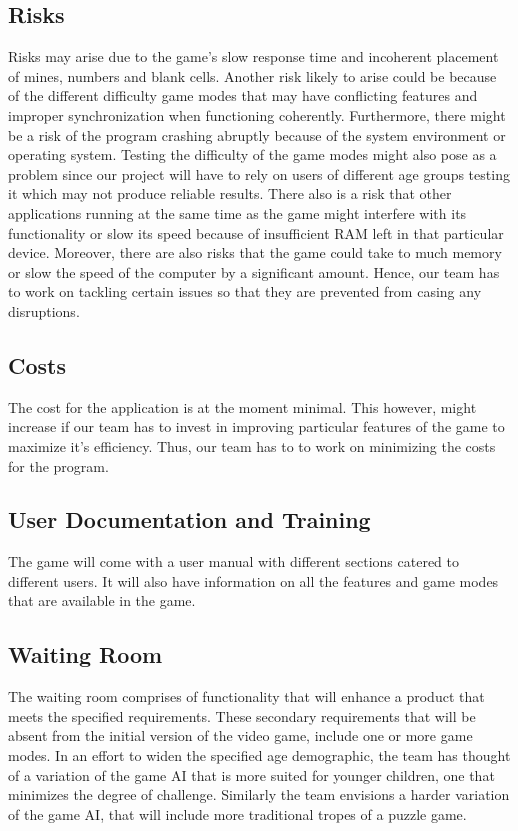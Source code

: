 \documentclass[12pt, titlepage]{article}
\begin{document}
\subsection{Risks}

Risks may arise due to the game's slow response time and incoherent placement of mines, numbers and blank cells. Another risk likely
to arise could be because of the different difficulty game modes that may have conflicting features and improper synchronization when
functioning coherently. Furthermore, there might be a risk of the program crashing abruptly because of the system environment or
operating system. Testing the difficulty of the game modes might also pose as a problem since our project will have to rely on users of
different age groups testing it which may not produce reliable results. There also is a risk that other applications running at the same
time as the game might interfere with its functionality or slow its speed because of insufficient RAM left in that particular device.
Moreover, there are also risks that the game could take to much memory or slow the speed of the computer by a significant amount.
Hence, our team has to work on tackling certain issues so that they are prevented from casing any disruptions.

\subsection{Costs}

The cost for the application is at the moment minimal. This however, might increase if our team has to invest in improving particular
features of the game to maximize it's efficiency. Thus, our team has to to work on minimizing the costs for the program.

\subsection{User Documentation and Training}

The game will come with a user manual with different sections catered to different users. It will also have information on all the features
and game modes that are available in the game.

\subsection{Waiting Room}

The waiting room comprises of functionality that will enhance a product that meets the specified requirements. These secondary
requirements that will be absent from the initial version of the video game, include one or more game modes. In an effort to widen the
specified age demographic, the team has thought of a variation of the game AI that is more suited for younger children, one that
minimizes the degree of challenge. Similarly the team envisions a harder variation of the game AI, that will include more traditional
tropes of a puzzle game.
\end{document}
